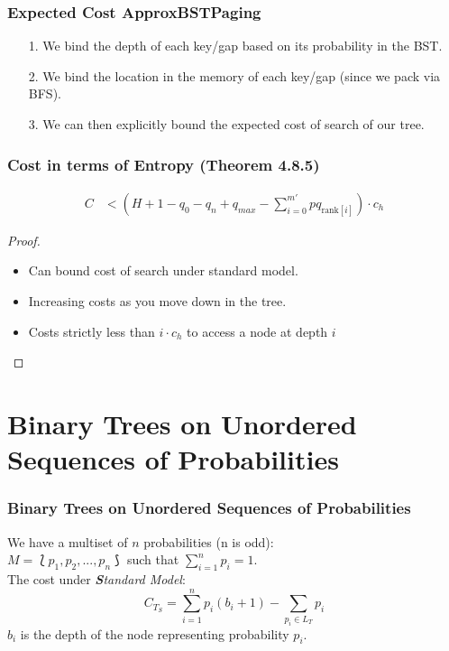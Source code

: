 \documentclass{beamer}
\theoremstyle{plain}
\begin{document}
\begin{frame} \frametitle{Expected Cost ApproxBSTPaging}\label{48}
\begin{itemize}
\item[1.] We bind the depth of each key/gap based on its probability in the BST.
\item[2.] We bind the location in the memory of each key/gap (since we pack via BFS).
\item[3.] We can then explicitly bound the expected cost of search of our tree.
\end{itemize}
\end{frame}

\begin{frame}\frametitle{Cost in terms of Entropy (Theorem 4.8.5)}
\begin{align*}
C &<  (H + 1 - q_0 - q_n + q_{max} - \sum_{i=0}^{m'} pq_{\text{rank}[i]})\cdot c_h
\end{align*}
\begin{proof}
\begin{itemize}
\item Can bound cost of search under standard model.
\item Increasing costs as you move down in the tree.
\item Costs strictly less than $i \cdot c_h$ to access a node at depth $i$
\end{itemize}
\end{proof}
\end{frame}


\section{Binary Trees on Unordered Sequences of Probabilities}\label{BST over Multisets}

\begin{frame} \frametitle{Binary Trees on Unordered Sequences of Probabilities}
We have a multiset of $n$ probabilities (n is odd): \\
$M = \lbag p_1, p_2, ..., p_n \rbag$ such that $\sum\limits_{i=1}^n p_i = 1$.  \\
The cost under \textit{\textbf{S}tandard Model}:
\begin{equation}
C_{T_S} = \sum_{i=1}^{n} p_i(b_i+1) - \sum_{p_i \in L_T} p_i
\end{equation}
$b_i$ is the depth of the node representing probability $p_i$.
\end{frame}
\end{document}
